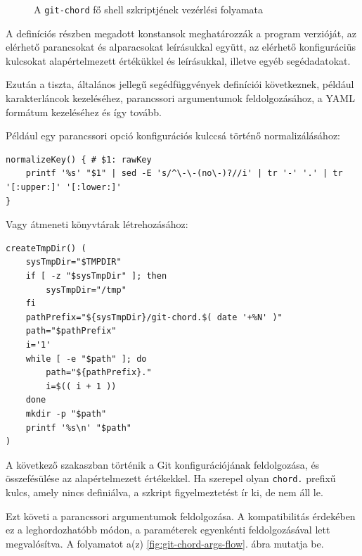 \documentclass[
]{elteikthesis}[2025/03/25]
\begin{document}
\begin{figure}[p]
\centering

\caption{A \texttt{git-chord} fő shell szkriptjének vezérlési folyamata}
\label{fig:git-chord-flow}
\end{figure}

A definíciós részben megadott konstansok meghatározzák a program verzióját,
az elérhető parancsokat és alparacsokat leírásukkal együtt,
az elérhető konfiguráciüs kulcsokat alapértelmezett értékükkel és leírásukkal,
illetve egyéb segédadatokat.

Ezután a tiszta, általános jellegű segédfüggvények definíciói következnek,
például karakterláncok kezeléséhez,
parancssori argumentumok feldolgozásához,
a YAML formátum kezeléséhez
és így tovább.

Például egy parancssori opció konfigurációs kulccsá történő normalizálásához:

\begin{listing}[H]
\begin{verbatim}
normalizeKey() { # $1: rawKey
    printf '%s' "$1" | sed -E 's/^\-\-(no\-)?//i' | tr '-' '.' | tr '[:upper:]' '[:lower:]'
}
\end{verbatim}
\caption{Parancssori opció normalizálása konfigurációs kulccsá}
\end{listing}

Vagy átmeneti könyvtárak létrehozásához:

\begin{listing}[H]
\begin{verbatim}
createTmpDir() (
    sysTmpDir="$TMPDIR"
    if [ -z "$sysTmpDir" ]; then
        sysTmpDir="/tmp"
    fi
    pathPrefix="${sysTmpDir}/git-chord.$( date '+%N' )"
    path="$pathPrefix"
    i='1'
    while [ -e "$path" ]; do
        path="${pathPrefix}."
        i=$(( i + 1 ))
    done
    mkdir -p "$path"
    printf '%s\n' "$path"
)
\end{verbatim}
\caption{Átmeneti könyvtár készítése, POSIX-kompatibilis}
\end{listing}

A következő szakaszban történik a Git konfigurációjának feldolgozása, és összefésülése az alapértelmezett értékekkel.
Ha szerepel olyan \verb|chord.| prefixű kulcs, amely nincs definiálva,
a szkript figyelmeztetést ír ki, de nem áll le.

Ezt követi a parancssori argumentumok feldolgozása.
A kompatibilitás érdekében ez a leghordozhatóbb módon,
a paraméterek egyenkénti feldolgozásával lett megvalósítva.
A folyamatot a(z) \ref{fig:git-chord-args-flow}. ábra mutatja be.
\end{document}
